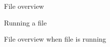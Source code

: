 \begin{figure}[h!]
    \centering
        \caption{File overview}
        \label{file-overview}
\end{figure}

\begin{figure}[h!]
    \centering
        \caption{Running a file}
        \label{run-file}
\end{figure}

\begin{figure}[h!]
    \centering
        \caption{File overview when file is running}
        \label{file-running}
\end{figure}

